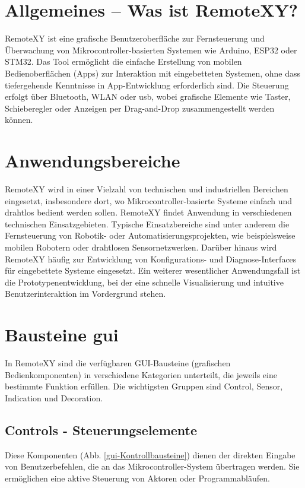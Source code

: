 \section{Allgemeines – Was ist RemoteXY?}

RemoteXY ist eine grafische Benutzeroberfläche zur Fernsteuerung und Überwachung von Mikrocontroller-basierten Systemen wie Arduino, ESP32 oder STM32. Das Tool ermöglicht die einfache Erstellung von mobilen Bedienoberflächen (Apps) zur Interaktion mit eingebetteten Systemen, ohne dass tiefergehende Kenntnisse in App-Entwicklung erforderlich sind. Die Steuerung erfolgt über Bluetooth, WLAN oder \ac{usb}, wobei grafische Elemente wie Taster, Schieberegler oder Anzeigen per Drag-and-Drop zusammengestellt werden können. \cite{EVCodeLabs:2025c}

\section{Anwendungsbereiche}

RemoteXY wird in einer Vielzahl von technischen und industriellen Bereichen eingesetzt, insbesondere dort, wo Mikrocontroller-basierte Systeme einfach und drahtlos bedient werden sollen.
RemoteXY findet Anwendung in verschiedenen technischen Einsatzgebieten. Typische Einsatzbereiche sind unter anderem die Fernsteuerung von Robotik- oder Automatisierungsprojekten, wie beispielsweise mobilen Robotern oder drahtlosen Sensornetzwerken. Darüber hinaus wird RemoteXY häufig zur Entwicklung von Konfigurations- und Diagnose-Interfaces für eingebettete Systeme eingesetzt. Ein weiterer wesentlicher Anwendungsfall ist die Prototypenentwicklung, bei der eine schnelle Visualisierung und intuitive Benutzerinteraktion im Vordergrund stehen.\cite{EVCodeLabs:2025c} \cite{EVCodeLabs:2025b}

\section{Bausteine \ac{gui}}

In RemoteXY sind die verfügbaren GUI-Bausteine (grafischen Bedienkomponenten) in verschiedene Kategorien unterteilt, die jeweils eine bestimmte Funktion erfüllen. Die wichtigsten Gruppen sind Control, Sensor, Indication und Decoration. \cite{EVCodeLabs:2025d}

\subsection{Controls - Steuerungselemente}
Diese Komponenten (Abb. \ref{gui-Kontrollbausteine}) dienen der direkten Eingabe von Benutzerbefehlen, die an das Mikrocontroller-System übertragen werden. Sie ermöglichen eine aktive Steuerung von Aktoren oder Programmabläufen. \cite{EVCodeLabs:2025e}

